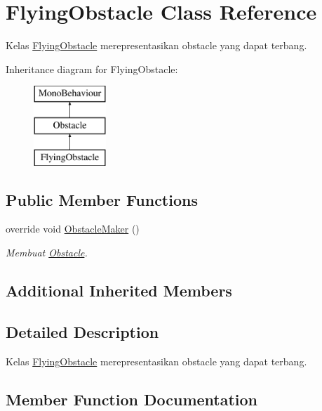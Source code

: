 \hypertarget{class_flying_obstacle}{}\section{Flying\+Obstacle Class Reference}
\label{class_flying_obstacle}


Kelas \hyperlink{class_flying_obstacle}{Flying\+Obstacle} merepresentasikan obstacle yang dapat terbang.  


Inheritance diagram for Flying\+Obstacle\+:\begin{figure}[H]
\begin{center}
\leavevmode
\includegraphics[height=3.000000cm]{class_flying_obstacle}
\end{center}
\end{figure}
\subsection*{Public Member Functions}
\begin{DoxyCompactItemize}
\item 
override void \hyperlink{class_flying_obstacle_a1c21c97ab8d9efa1c120103a2cd5cb34}{Obstacle\+Maker} ()
\begin{DoxyCompactList}\small\item\em Membuat \hyperlink{class_obstacle}{Obstacle}. \end{DoxyCompactList}\end{DoxyCompactItemize}
\subsection*{Additional Inherited Members}


\subsection{Detailed Description}
Kelas \hyperlink{class_flying_obstacle}{Flying\+Obstacle} merepresentasikan obstacle yang dapat terbang. 



\subsection{Member Function Documentation}
\hypertarget{class_flying_obstacle_a1c21c97ab8d9efa1c120103a2cd5cb34}{}\label{class_flying_obstacle_a1c21c97ab8d9efa1c120103a2cd5cb34} 
